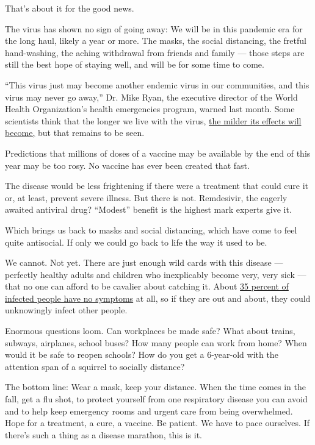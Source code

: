 That's about it for the good news.

The virus has shown no sign of going away: We will be in this pandemic
era for the long haul, likely a year or more. The masks, the social
distancing, the fretful hand-washing, the aching withdrawal from friends
and family --- those steps are still the best hope of staying well, and
will be for some time to come.

``This virus just may become another endemic virus in our communities,
and this virus may never go away,'' Dr. Mike Ryan, the executive
director of the World Health Organization's health emergencies program,
warned last month. Some scientists think that the longer we live with
the virus,
\href{https://www.nytimes3xbfgragh.onion/2020/04/18/health/coronavirus-america-future.html}{the
milder its effects will become,} but that remains to be seen.

Predictions that millions of doses of a vaccine may be available by the
end of this year may be too rosy. No vaccine has ever been created that
fast.

The disease would be less frightening if there were a treatment that
could cure it or, at least, prevent severe illness. But there is not.
Remdesivir, the eagerly awaited antiviral drug? ``Modest'' benefit is
the highest mark experts give it.

Which brings us back to masks and social distancing, which have come to
feel quite antisocial. If only we could go back to life the way it used
to be.

We cannot. Not yet. There are just enough wild cards with this disease
--- perfectly healthy adults and children who inexplicably become very,
very sick --- that no one can afford to be cavalier about catching it.
About
\href{https://www.cdc.gov/coronavirus/2019-ncov/hcp/planning-scenarios.html}{35
percent of infected people have no symptoms} at all, so if they are out
and about, they could unknowingly infect other people.

Enormous questions loom. Can workplaces be made safe? What about trains,
subways, airplanes, school buses? How many people can work from home?
When would it be safe to reopen schools? How do you get a 6-year-old
with the attention span of a squirrel to socially distance?

The bottom line: Wear a mask, keep your distance. When the time comes in
the fall, get a flu shot, to protect yourself from one respiratory
disease you can avoid and to help keep emergency rooms and urgent care
from being overwhelmed. Hope for a treatment, a cure, a vaccine. Be
patient. We have to pace ourselves. If there's such a thing as a disease
marathon, this is it.

